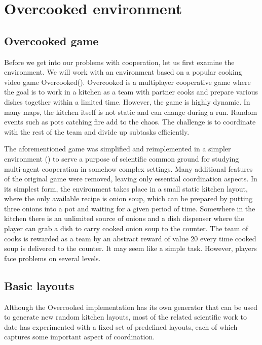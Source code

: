 \chapter{Overcooked environment}\label{OvercookedChapter}

\section{Overcooked game}
Before we get into our problems with cooperation, let us first examine the environment. 
We will work with an environment based on a popular cooking video game Overcooked(\cite{OvercookedGame}).
Overcooked is a multiplayer cooperative game where the goal is to work in a kitchen as a team with partner cooks and prepare various dishes together within a limited time.
However, the game is highly dynamic. In many maps, the kitchen itself is not static and can change during a run. 
Random events such as pots catching fire add to the chaos. The challenge is to coordinate with the rest of the team and divide up subtasks efficiently.

\par
The aforementioned game was simplified and reimplemented in a simpler environment (\cite{OvercookedImplementation}) to serve a purpose of scientific common ground for studying multi-agent cooperation in somehow complex settings.
Many additional features of the original game were removed, leaving only essential coordination aspects.
In its simplest form, the environment takes place in a small static kitchen layout, where the only available recipe is onion soup, which can be prepared by putting three onions into a pot and waiting for a given period of time.
Somewhere in the kitchen there is an unlimited source of onions and a dish dispenser where the player can grab a dish to carry cooked onion soup to the counter.
The team of cooks is rewarded as a team by an abstract reward of value 20 every time cooked soup is delivered to the counter. 
It may seem like a simple task. However, players face problems on several levels.

\section{Basic layouts}\label{layouts}
Although the Overcooked implementation has its own generator that can be used to generate new random kitchen layouts, most of the related scientific work to date has experimented with a fixed set of predefined layouts, each of which captures some important aspect of coordination.


